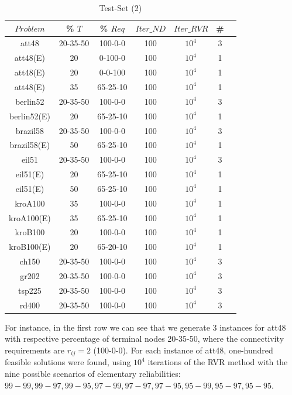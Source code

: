 \begin{table}[H]
\caption{Test-Set (2)} %
\centering  %
\begin{tabular}{|c|c|c|c|c|c|c|} %
\hline	$Problem$   &	\% $T$ & \% $Req$ & $Iter\_ND$ & $Iter\_RVR$ & \# \\
\hline	att48 &	20-35-50			&   100-0-0	&	100	&	$10^4$	&	3	\\
\hline	att48(E)	&	20	        &   0-100-0	&	100	&	$10^4$	&	1	\\
\hline	att48(E)	&	20	         &	0-0-100	&	100	&	$10^4$	&	1	\\
\hline	att48(E)	&	35       	 &	65-25-10	&100	&	$10^4$	&	1	\\
\hline	berlin52	&	20-35-50	 &	100-0-0	&	100&	$10^4$	&	3	\\
\hline	berlin52(E)	&	20	         &	65-25-10&   100	&	$10^4$	&	1	\\
\hline	brazil58	&	20-35-50	 &	100-0-0	&	100	&	$10^4$	&	3	\\
\hline	brazil58(E)	&	50	         &	65-25-10	&100	&	$10^4$	&	1	\\
\hline	eil51   	&	20-35-50	 &	100-0-0	&	100	&	$10^4$	&	3	\\
\hline	eil51(E)	&	20	         &	65-25-10	&	100	&	$10^4$	&	1	\\
\hline	eil51(E)	&	50	         &	65-25-10	&	100	&	$10^4$	&	1	\\
\hline	kroA100  	&	35	         &	100-0-0	&	100	&	$10^4$	&	1	\\
\hline	kroA100(E)  &	35	         &	65-25-10	&100	&	$10^4$	&	1	\\
\hline	kroB100	    &	20	         &	100-0-0	&	100	&	$10^4$	&	1	\\
\hline	kroB100(E)	&	20	         &	65-20-10	&100	&	$10^4$	&	1	\\
\hline	ch150    	&	20-35-50	 &	100-0-0	&	100	&	$10^4$	&	3	\\
\hline	gr202	    &	20-35-50	 &	100-0-0	&	100	&	$10^4$	&	3	\\
\hline	tsp225	    &	20-35-50	 &	100-0-0	&	100	&	$10^4$	&	3	\\
\hline	rd400	    &	20-35-50	 &	100-0-0	&	100	&	$10^4$	&	3	\\
\hline
\end{tabular}
\label{set2} %
\end{table}

For instance, in the first row we can see that we generate 3 instances for att48 with respective 
percentage of terminal nodes 20-35-50, where the connectivity requirements are $r_{ij}=2$ (100-0-0). 
For each instance of att48, one-hundred feasible solutions were found, using $10^4$ 
iterations of the RVR method with the nine possible scenarios of elementary reliabilities: 
$99-99, 99-97, 99-95, 97-99, 97-97, 97-95, 95-99, 95-97, 95-95$.\\
 
